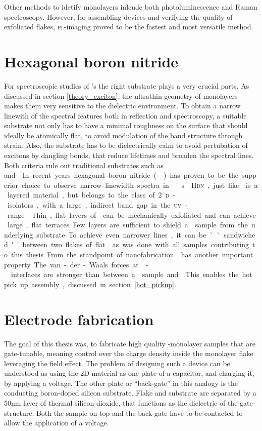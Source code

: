 Other methods to idetify monolayers inlcude both photoluminescence and Raman spectroscopy\cite{zhao_lattice_2013,zhang_phonon_2015,tonndorf_photoluminescence_2013}. However, for assembling devices and verifying the quality of exfoliated flakes, \textsc{pl}-imaging proved to be the fastest and most versatile method.

\section{Hexagonal boron nitride}

For spectroscopic studies of \tmd's the right substrate plays a very crucial parts. As discussed in section \ref{theory_exciton}, the ultrathin geometry of \tmdg monolayers makes them very sensitive to the dielectric environment. To obtain a narrow linewith of the spectral features both in reflection and \pl spectroscopy, a suitable substrate not only has to have a minimal roughness on the surface that should ideally be atomically flat, to avoid modulation of the band structure through strain. Also, the substrate has to be dielectrically calm to avoid pertubation of excitons by dangling bonds, that reduce lifetimes and broaden the spectral lines. Both criteria rule out traditional substrates such as \si and \sio. In recent years hexagonal boron nitride (\hbn) has proven to be the supperior choice to observe narrow linewidth spectra in \tmd's\cite{courtade_spectrally_2018}. \textsc{Hbn}, just like \tmds is a layered material, but belongs to the class of 2\textsc{d}-isolators, with a large, indirect band gap in the \textsc{uv}-range\cite{arnaud_huge_2006}. Thin, flat layers of \hbng can be mechanically exfoliated and can achieve large, flat terraces. Few layers are sufficient to shield a \tmdg sample from the underlying substrate. To achieve even narrower lines, it can be ``sandwiched'' between two flakes of flat \hbng as was done with all samples contributing to this thesis. From the standpoint of nanofabrication \hbng has another important property. The van-der-Waals forces at \hbn-\tmdg interfaces are stronger than between a \tmdg sample and \sio. This enables the hot pick up assembly, discussed in section \ref{hot_pickup}.

\section{Electrode fabrication}

The goal of this thesis was, to fabricate high quality \tmd-monolayer samples that are gate-tunable, meaning control over the charge density inside the monolayer flake leveraging the field effect. The problem of designing such a device can be understood as using the 2D-material as one plate of a capacitor, and charging it, by applying a voltage. The other plate or ``back-gate'' in this analogy is the conducting boron-doped silicon substrate. Flake and substrate are separated by a 50nm layer of thermal silicon-dioxide, that functions as the dielectric of the gate-structure. Both the sample on top and the back-gate have to be contacted to allow the application of a voltage.

